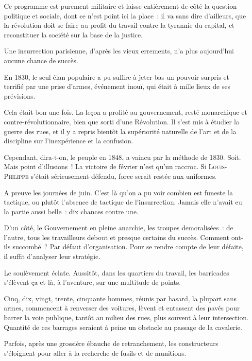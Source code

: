 \documentclass[french,twoside]{book} %
\newcommand\chaptercont{} %
\begin{document}
\chaptercont
\noindent Ce programme est purement militaire et laisse entièrement de côté la question politique et sociale, dont ce n’est point ici la place : il va sans dire d’ailleurs, que la révolution doit se faire au profit du travail contre la tyrannie du capital, et reconstituer la société sur la base de la justice.\par
Une insurrection parisienne, d’après les vieux errements, n’a plus aujourd’hui aucune chance de succès.\par
En 1830, le seul élan populaire a pu suffire à jeter bas un pouvoir surpris et terrifié par une prise d’armes, événement inouï, qui était à mille lieux de ses prévisions.\par
Cela était bon une fois. La leçon a profité au gouvernement, resté monarchique et contre-révolutionnaire, bien que sorti d’une Révolution. Il s’est mis à étudier la guerre des rues, et il y a repris bientôt la supériorité naturelle de l’art et de la discipline sur l’inexpérience et la confusion.\par
Cependant, dira-t-on, le peuple en 1848, a vaincu par la méthode de 1830. Soit. Mais point d’illusions ! La victoire de février n’est qu’un raccroc. Si {\scshape Louis-Philippe} s’était sérieusement défendu, force serait restée aux uniformes.\par
A preuve les journées de juin. C'est là qu’on a pu voir combien est funeste la tactique, ou plutôt l’absence de tactique de l’insurrection. Jamais elle n’avait eu la partie aussi belle : dix chances contre une.\par
D'un côté, le Gouvernement en pleine anarchie, les troupes demoralisées : de l’autre, tous les travailleurs debout et presque certains du succès. Comment ont-ils succombé ? Par défaut d’organisation. Pour se rendre compte de leur défaite, il suffit d’analyser leur stratégie.\par
Le soulèvement éclate. Aussitôt, dans les quartiers du travail, les barricades s’élèvent ça et là, à l’aventure, sur une multitude de points.\par
Cinq, dix, vingt, trente, cinquante hommes, réunis par hasard, la plupart sans armes, commencent à renverser des voitures, lèvent et entassent des pavés pour barrer la voie publique, tantôt au milieu des rues, plus souvent à leur intersection. Quantité de ces barrages seraient à peine un obstacle au passage de la cavalerie.\par
Parfois, après une grossière ébauche de retranchement, les constructeurs s’éloignent pour aller à la recherche de fusils et de munitions.\par
\end{document}
